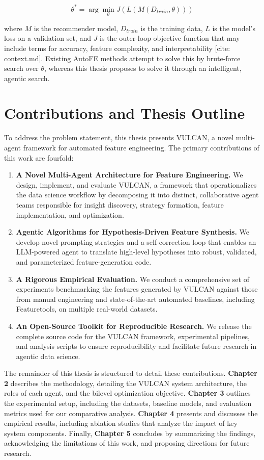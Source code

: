 \begin{equation}
    \theta^* = \arg\min_{\theta} J(L(M(D_{train}, \theta)))
\end{equation}

where $M$ is the recommender model, $D_{train}$ is the training data, $L$ is the model's loss on a validation set, and $J$ is the outer-loop objective function that may include terms for accuracy, feature complexity, and interpretability [cite: context.md]. Existing AutoFE methods attempt to solve this by brute-force search over $\theta$, whereas this thesis proposes to solve it through an intelligent, agentic search.

\section{Contributions and Thesis Outline}
\label{sec:intro_contributions}

To address the problem statement, this thesis presents VULCAN, a novel multi-agent framework for automated feature engineering. The primary contributions of this work are fourfold:

\begin{enumerate}
    \item \textbf{A Novel Multi-Agent Architecture for Feature Engineering.} We design, implement, and evaluate VULCAN, a framework that operationalizes the data science workflow by decomposing it into distinct, collaborative agent teams responsible for insight discovery, strategy formation, feature implementation, and optimization.
    \item \textbf{Agentic Algorithms for Hypothesis-Driven Feature Synthesis.} We develop novel prompting strategies and a self-correction loop that enables an LLM-powered agent to translate high-level hypotheses into robust, validated, and parameterized feature-generation code.
    \item \textbf{A Rigorous Empirical Evaluation.} We conduct a comprehensive set of experiments benchmarking the features generated by VULCAN against those from manual engineering and state-of-the-art automated baselines, including Featuretools, on multiple real-world datasets.
    \item \textbf{An Open-Source Toolkit for Reproducible Research.} We release the complete source code for the VULCAN framework, experimental pipelines, and analysis scripts to ensure reproducibility and facilitate future research in agentic data science.
\end{enumerate}

The remainder of this thesis is structured to detail these contributions. \textbf{Chapter 2} describes the methodology, detailing the VULCAN system architecture, the roles of each agent, and the bilevel optimization objective. \textbf{Chapter 3} outlines the experimental setup, including the datasets, baseline models, and evaluation metrics used for our comparative analysis. \textbf{Chapter 4} presents and discusses the empirical results, including ablation studies that analyze the impact of key system components. Finally, \textbf{Chapter 5} concludes by summarizing the findings, acknowledging the limitations of this work, and proposing directions for future research.
